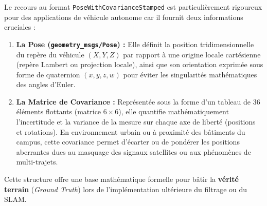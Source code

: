 \documentclass[12pt,a4paper,oneside]{report}
\begin{document}
Le recours au format \texttt{PoseWithCovarianceStamped} est particulièrement rigoureux pour des applications de véhicule autonome car il fournit deux informations cruciales :
\begin{enumerate}
    \item \textbf{La Pose (\texttt{geometry\_msgs/Pose}) :} Elle définit la position tridimensionnelle du repère du véhicule $(X, Y, Z)$ par rapport à une origine locale cartésienne (repère Lambert ou projection locale), ainsi que son orientation exprimée sous forme de quaternion $(x, y, z, w)$ pour éviter les singularités mathématiques des angles d'Euler.
    \item \textbf{La Matrice de Covariance :} Représentée sous la forme d'un tableau de 36 éléments flottants (matrice $6 \times 6$), elle quantifie mathématiquement l'incertitude et la variance de la mesure sur chaque axe de liberté (positions et rotations). En environnement urbain ou à proximité des bâtiments du campus, cette covariance permet d'écarter ou de pondérer les positions aberrantes dues au masquage des signaux satellites ou aux phénomènes de multi-trajets.
\end{enumerate}

Cette structure offre une base mathématique formelle pour bâtir la \textbf{vérité terrain} (\textit{Ground Truth}) lors de l'implémentation ultérieure du filtrage ou du SLAM.
\end{document}

